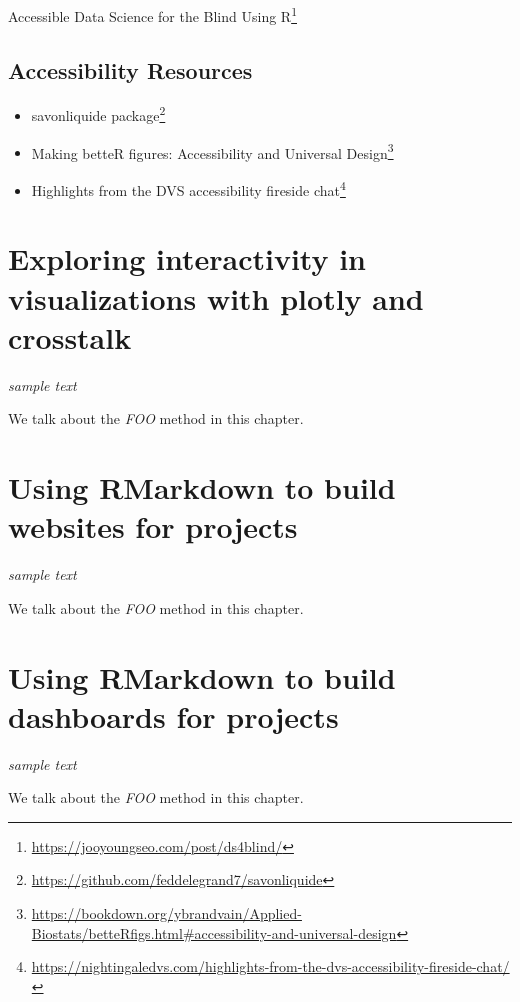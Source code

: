 \documentclass[
]{krantz}
\renewcommand{\href}[2]{#2\footnote{\url{#1}}}
\begin{document}
\href{https://jooyoungseo.com/post/ds4blind/}{Accessible Data Science for the Blind Using R}

\hypertarget{accessibility-resources}{%
\section{Accessibility Resources}\label{accessibility-resources}}

\begin{itemize}
\item
  \href{https://github.com/feddelegrand7/savonliquide}{savonliquide package}
\item
  \href{https://bookdown.org/ybrandvain/Applied-Biostats/betteRfigs.html\#accessibility-and-universal-design}{Making betteR figures: Accessibility and Universal Design}
\item
  \href{https://nightingaledvs.com/highlights-from-the-dvs-accessibility-fireside-chat/}{Highlights from the DVS accessibility fireside chat}
\end{itemize}

\hypertarget{interactive-visualizations}{%
\chapter{Exploring interactivity in visualizations with plotly and crosstalk}\label{interactive-visualizations}}

\emph{sample text}

We talk about the \emph{FOO} method in this chapter.

\hypertarget{rmarkdown-websites}{%
\chapter{Using RMarkdown to build websites for projects}\label{rmarkdown-websites}}

\emph{sample text}

We talk about the \emph{FOO} method in this chapter.

\hypertarget{rmarkdown-dashboards}{%
\chapter{Using RMarkdown to build dashboards for projects}\label{rmarkdown-dashboards}}

\emph{sample text}

We talk about the \emph{FOO} method in this chapter.
\end{document}
